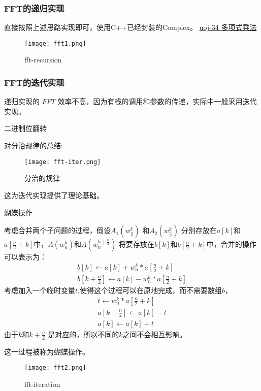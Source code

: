 \subsubsection{FFT的递归实现}
直接按照上述思路实现即可，使用C++已经封装的Complex。
\href{http://uoj.ac/problem/34}{uoj-34 多项式乘法}

\begin{figure}[!htbp]
	\centering
	\texttt{[image: fft1.png]}
	\caption{fft-recursion \label{fig:fft1}}
\end{figure}




\subsubsection{FFT的迭代实现}
递归实现的 $FFT$ 效率不高，因为有栈的调用和参数的传递，实际中一般采用迭代实现。

{\heiti 二进制位翻转}

对分治规律的总结:
\begin{figure}[!htbp]
	\centering
	\texttt{[image: fft-iter.png]}
	\caption{分治的规律 \label{fig:fft-pattern}}
\end{figure}
这为迭代实现提供了理论基础。

{\heiti 蝴蝶操作}

考虑合并两个子问题的过程，假设$A_1(w_{\frac{n}{2}}^k)$ 和$A_2(w_{\frac{n}{2}}^k)$ 分别存放在$a[k]$和$a[\frac{n}{2}+k]$中，$A(w_n^k)$和$A(w_n^{k+\frac{n}{2}})$ 将要存放在$b[k]$和$b[\frac{n}{2}+k]$中，合并的操作可以表示为：
\begin{align*}
b[k]\leftarrow  a[k]+w_n^k*a[\frac{n}{2}+k]  \\
b[k+\frac{n}{2}] \leftarrow a[k]-w_n^k*a[\frac{n}{2}+k]
\end{align*}
考虑加入一个临时变量$t$,使得这个过程可以在原地完成，而不需要数组$b$，	
\begin{align*}
t \leftarrow w_n^k*a[\frac{n}{2}+k]   \\
a[k+\frac{n}{2}] \leftarrow a[k]-t  \\
a[k] \leftarrow a[k]+t
\end{align*}
由于$k$和$k+\frac{n}{2}$ 是对应的，所以不同的$k$之间不会相互影响。

这一过程被称为蝴蝶操作。

\begin{figure}[!htbp]
	\centering
	\texttt{[image: fft2.png]}
	\caption{fft-iteration \label{fig:fft2}}
\end{figure}

